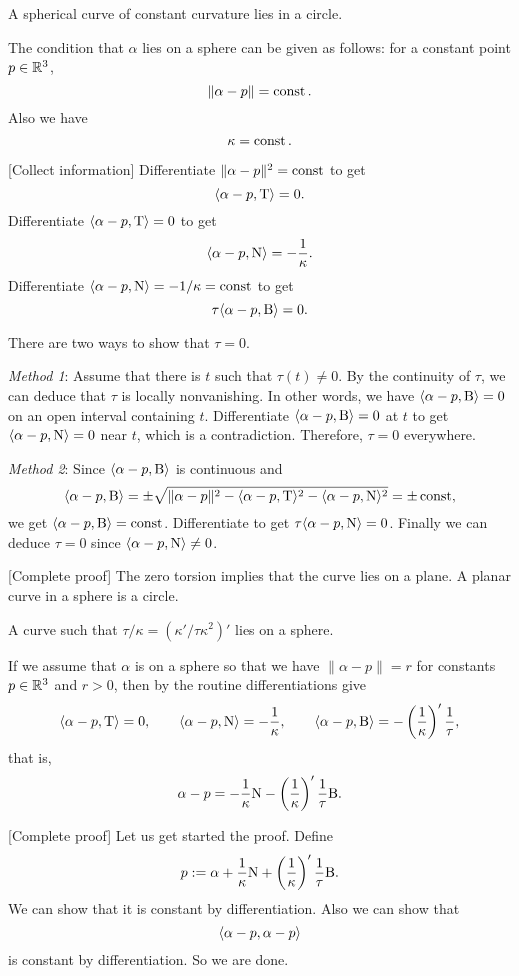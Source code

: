\documentclass{../../large}
\def\a{\alpha}
\begin{document}
\begin{prb}
A spherical curve of constant curvature lies in a circle.
\end{prb}
\begin{sol}
The condition that $\a$ lies on a sphere can be given as follows: for a constant point $p\in\mathbb{R}^3$,
\[\|\a-p\|=\const.\]
Also we have
\[\kappa=\operatorname{const}.\]

[Collect information]
Differentiate $\|\a-p\|^2=\const$ to get
\[\<\a-p,\rT\>=0.\]
Differentiate $\<\a-p,\rT\>=0$ to get
\[\<\a-p,\rN\>=-\frac1\kappa.\]
Differentiate $\<\a-p,\rN\>=-1/\kappa=\const$ to get
\[\tau\<\a-p,\rB\>=0.\]

There are two ways to show that $\tau=0$.

\emph{Method 1}:
Assume that there is $t$ such that $\tau(t)\ne0$.
By the continuity of $\tau$, we can deduce that $\tau$ is locally nonvanishing.
In other words, we have $\<\a-p,\rB\>=0$ on an open interval containing $t$.
Differentiate $\<\a-p,\rB\>=0$ at $t$ to get $\<\a-p,\rN\>=0$ near $t$, which is a contradiction.
Therefore, $\tau=0$ everywhere.

\emph{Method 2}:
Since $\<\a-p,\rB\>$ is continuous and
\[\<\a-p,\rB\>=\pm\sqrt{\|\a-p\|^2-\<\a-p,\rT\>^2-\<\a-p,\rN\>^2}=\pm\const,\]
we get $\<\a-p,\rB\>=\const$.
Differentiate to get $\tau\<\a-p,\rN\>=0$.
Finally we can deduce $\tau=0$ since $\<\a-p,\rN\>\ne0$.

[Complete proof]
The zero torsion implies that the curve lies on a plane.
A planar curve in a sphere is a circle.
\end{sol}

\begin{prb}
A curve such that $\tau/\kappa=(\kappa'/\tau\kappa^2)'$ lies on a sphere.
\end{prb}
\begin{sol}
If we assume that $\a$ is on a sphere so that we have $\|\a-p\|=r$ for constants $p\in\mathbb{R}^3$ and $r>0$, then by the routine differentiations give
\[\<\a-p,\rT\>=0,\qquad\<\a-p,\rN\>=-\frac1\kappa,\qquad\<\a-p,\rB\>=-\left(\frac1\kappa\right)'\frac1\tau,\]
that is,
\[\a-p=-\frac1\kappa\rN-\left(\frac1\kappa\right)'\frac1\tau\rB.\]

[Complete proof]
Let us get started the proof.
Define
\[p:=\a+\frac1\kappa\rN+\left(\frac1\kappa\right)'\frac1\tau\rB.\]
We can show that it is constant by differentiation.
Also we can show that
\[\<\a-p,\a-p\>\]
is constant by differentiation.
So we are done.
\end{sol}
\end{document}
